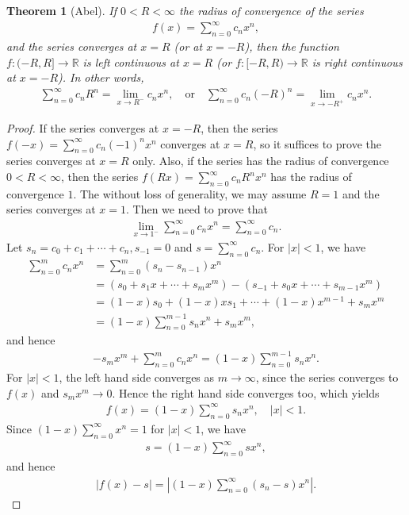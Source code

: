 \documentclass[10pt]{book}
\newtheorem{theorem}{Theorem}[chapter]
\theoremstyle{definition}
\numberwithin{equation}{chapter}
\begin{document}
\medskip

\begin{theorem}[Abel]\label{th_626}
If $0 < R < \infty$ the radius of convergence of the series
\begin{align*}
    f(x) = \sum^\infty_{n=0} c_n x^n,
\end{align*}
and the series converges at $x = R$ (or at $x = -R$), then the function $f:(-R,R] \to \mathbb{R}$ is left continuous at $x = R$ (or $f:[-R,R) \to \mathbb{R}$ is right continuous at $x = -R$). In other words,
\begin{align*}
    \sum^\infty_{n=0} c_n R^n = \lim_{x \to R^-} c_n x^n, \quad \text{or} \quad \sum^\infty_{n=0} c_n (-R)^n = \lim_{x \to -R^+} c_n x^n.
\end{align*}
\end{theorem}
\begin{proof}
If the series converges at $x = -R$, then the series $f(-x) = \sum^\infty_{n=0} c_n (-1)^n x^n$ converges at $x = R$, so it suffices to prove the series converges at $x = R$ only. Also, if the series has the radius of convergence $0 < R < \infty$, then the series $f(Rx) = \sum^\infty_{n=0} c_n R^n x^n$ has the radius of convergence $1$. The without loss of generality, we may assume $R = 1$ and the series converges at $x = 1$. Then we need to prove that
\begin{align}\label{th_626_equ1}
    \lim_{x \to 1^-} \sum^\infty_{n=0} c_n x^n = \sum^\infty_{n=0} c_n.
\end{align}
Let $s_n = c_0 + c_1 + \cdots + c_n, s_{-1} = 0$ and $s = \sum^\infty_{n=0} c_n$. For $\left|x\right| < 1$, we have
\begin{align*}
    \sum^m_{n=0} c_n x^n & = \sum^m_{n=0} \left(s_n - s_{n-1}\right) x^n \\
    & = \left(s_0 + s_1 x + \cdots + s_m x^m\right) - \left(s_{-1} + s_0 x + \cdots + s_{m-1}x^m\right) \\
    & = (1 - x) s_0 + (1 - x)xs_1 + \cdots + (1 - x)x^{m-1} + s_m x^m \\
    & = (1 - x) \sum^{m-1}_{n=0} s_n x^n + s_m x^m,
\end{align*}
and hence
\begin{align*}
    - s_m x^m + \sum^m_{n=0} c_n x^n = (1 - x) \sum^{m-1}_{n=0} s_n x^n.
\end{align*}
For $\left|x\right| < 1$, the left hand side converges as $m \to \infty$, since the series converges to $f(x)$ and $s_m x^m \to 0$. Hence the right hand side converges too, which yields
\begin{align*}
    f(x) = (1 - x) \sum^{\infty}_{n=0} s_n x^n, \quad \left|x\right| < 1.
\end{align*}
Since $(1 - x) \sum^\infty_{n=0} x^n = 1$ for $\left|x\right| < 1$, we have
\begin{align*}
    s = (1 - x) \sum^\infty_{n=0} s x^n,
\end{align*}
and hence
\begin{align*}
    \left|f(x) - s\right| = \left|(1 - x) \sum^{\infty}_{n=0} (s_n - s) x^n\right|.
\end{align*}


\end{proof}
\end{document}
